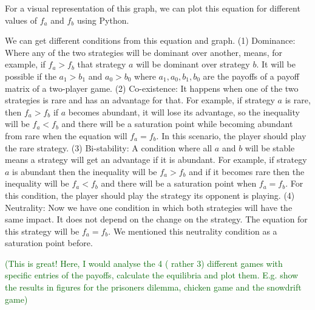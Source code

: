 \documentclass{article}
\newcommand{\cha}[1]{\textcolor{darkgreen}{(#1)}}
\begin{document}
For a visual representation of this graph, we can plot this equation for different values of $f_a$ and $f_b$ using Python.
\begin{figure}[h]
        \centering
        \label{fig:Visualization of $x_a(1-x_a)(f_a-f_b)=0$}
    \end{figure}
We can get different conditions from this equation and graph. 
(1) Dominance: Where any of the two strategies will be dominant over another, means, for example, if $f_a>f_b$ that strategy $a$ will be dominant over strategy $b$. It will be possible if the $a_1>b_1$ and $a_0>b_0$ where $a_1,a_0,b_1,b_0$ are the payoffs of a payoff matrix of a two-player game.
(2) Co-existence: It happens when one of the two strategies is rare and has an advantage for that. For example, if strategy $a$ is rare, then $f_a>f_b$ if $a$ becomes abundant, it will lose its advantage, so the inequality will be  $f_a<f_b$ and there will be a saturation point while becoming abundant from rare when the equation will $f_a=f_b$. In this scenario, the player should play the rare strategy.
(3) Bi-stability: A condition where all $a$ and $b$ will be stable means a strategy will get an advantage if it is abundant. For example, if strategy $a$ is abundant then the inequality will be $f_a>f_b$ and if it becomes rare then the inequality will be $f_a<f_b$ and there will be a saturation point when $f_a=f_b$. For this condition, the player should play the strategy its opponent is playing.
(4) Neutrality: Now we have one condition in which both strategies will have the same impact. It does not depend on the change on the strategy. The equation for this strategy will be $f_a=f_b$. We mentioned this neutrality condition as a saturation point before\cite{Gokhale2011}.

\cha{This is great! Here, I would analyse the 4 ( rather 3) different games with specific entries of the payoffs, calculate the equilibria and plot them. E.g. show the results in figures for the prisoners dilemma, chicken game and the snowdrift game}
\end{document}
